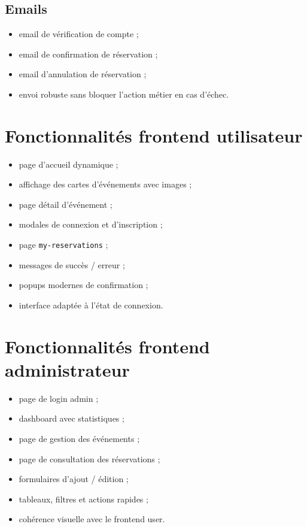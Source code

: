 \documentclass[12pt,a4paper]{report}
\begin{document}
\subsection{Emails}
\begin{itemize}[leftmargin=1.2cm]
    \item email de vérification de compte ;
    \item email de confirmation de réservation ;
    \item email d'annulation de réservation ;
    \item envoi robuste sans bloquer l'action métier en cas d'échec.
\end{itemize}

\section{Fonctionnalités frontend utilisateur}

\begin{itemize}[leftmargin=1.2cm]
    \item page d'accueil dynamique ;
    \item affichage des cartes d'événements avec images ;
    \item page détail d'événement ;
    \item modales de connexion et d'inscription ;
    \item page \texttt{my-reservations} ;
    \item messages de succès / erreur ;
    \item popups modernes de confirmation ;
    \item interface adaptée à l'état de connexion.
\end{itemize}

\section{Fonctionnalités frontend administrateur}

\begin{itemize}[leftmargin=1.2cm]
    \item page de login admin ;
    \item dashboard avec statistiques ;
    \item page de gestion des événements ;
    \item page de consultation des réservations ;
    \item formulaires d'ajout / édition ;
    \item tableaux, filtres et actions rapides ;
    \item cohérence visuelle avec le frontend user.
\end{itemize}
\end{document}
